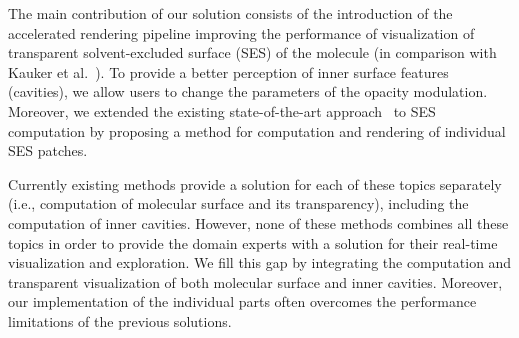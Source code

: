 The main contribution of our solution consists of the introduction of the accelerated rendering pipeline improving the performance of visualization of transparent solvent-excluded surface (SES) of the molecule (in comparison with Kauker et al.~\cite{kauker2013rendering}). To provide a better perception of inner surface features (cavities), we allow users to change the parameters of the opacity modulation. Moreover, we extended the existing state-of-the-art approach~\cite{krone2011parallel} to SES computation by proposing a method for computation and rendering of individual SES patches.
 
Currently existing methods provide a solution for each of these topics separately (i.e., computation of molecular surface and its transparency), including the computation of inner cavities.
However, none of these methods combines all these topics in order to provide the domain experts with a solution for their real-time visualization and exploration.
We fill this gap by integrating the computation and transparent visualization of both molecular surface and inner cavities.
Moreover, our implementation of the individual parts often overcomes the performance limitations of the previous solutions.



